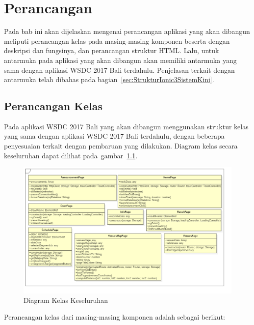 \chapter{Perancangan}
\label{chap:perancangan}

Pada bab ini akan dijelaskan mengenai perancangan aplikasi yang akan dibangun meliputi perancangan kelas pada masing-masing komponen beserta dengan deskripsi dan fungsinya, dan perancangan struktur HTML. Lalu, untuk antarmuka pada aplikasi yang akan dibangun akan memiliki antarmuka yang sama dengan aplikasi WSDC 2017 Bali terdahulu. Penjelasan terkait dengan antarmuka telah dibahas pada bagian~\ref{sec:StrukturIonic3SistemKini}. 

\section{Perancangan Kelas}
\label{sec:perancanganKelas}

Pada aplikasi WSDC 2017 Bali yang akan dibangun menggunakan struktur kelas yang sama dengan aplikasi WSDC 2017 Bali terdahulu, dengan beberapa penyesuaian terkait dengan pembaruan yang dilakukan. Diagram kelas secara keseluruhan dapat dilihat pada~gambar~\ref{fig:umldiagramkeseluruhan}.

\begin{figure}[H]
    \centering
    \includegraphics[scale=0.43]{Gambar/umldiagram.png}
    \caption{ Diagram Kelas Keseluruhan}
    \label{fig:umldiagramkeseluruhan}
\end{figure}

\newpage

Perancangan kelas dari masing-masing komponen adalah sebagai berikut:

